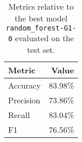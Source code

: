 \begin{table}[H]
\centering
\begin{tabularx}{0.48\textwidth}{|X|r|}
\hline
Metric & Value \\
\hline
Accuracy & 83.98\% \\
Precision & 73.86\% \\
Recall & 83.04\% \\
F1 & 76.56\% \\
\hline
\end{tabularx}
\caption{Metrics relative to the best model \texttt{random\_forest-G1-0} evaluated on the test set.}
\label{tab:best_model_metrics_test}

\end{table}
